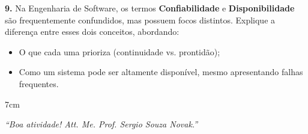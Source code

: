 \documentclass[12pt]{article}
\begin{document}
\vspace{0.8cm}
\vspace{0.5cm}

\textbf{9.} Na Engenharia de Software, os termos \textbf{Confiabilidade} e \textbf{Disponibilidade} são frequentemente confundidos, mas possuem focos distintos. Explique a diferença entre esses dois conceitos, abordando:
\begin{itemize}
    \item O que cada uma prioriza (continuidade vs. prontidão);
    \item Como um sistema pode ser altamente disponível, mesmo apresentando falhas frequentes.
\end{itemize}

\begin{resposta}{7cm}
\end{resposta}
\begin{center}
    \textit{“Boa atividade! Att. Me. Prof. Sergio Souza Novak.”}
\end{center}

\end{document}
